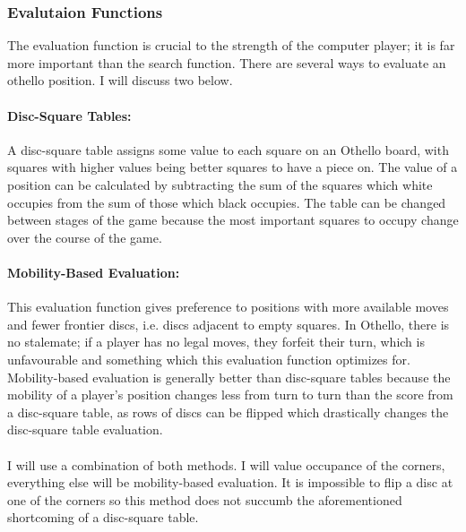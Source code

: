 \documentclass[12pt, a4paper]{report}
\begin{document}
\subsubsection{Evalutaion Functions}

The evaluation function is crucial to the strength of the computer player; it is far more important than the search function.
There are several ways to evaluate an othello position. I will discuss two below.

\paragraph{Disc-Square Tables:}

A disc-square table assigns some value to each square on an Othello board, with squares with higher values being better squares
to have a piece on. The value of a position can be calculated by subtracting the sum of
the squares which white occupies from the sum of those which black occupies. The table can be changed between stages of the game
because the most important squares to occupy change over the course of the game.

\paragraph{Mobility-Based Evaluation:}

This evaluation function gives preference to positions with more available moves and fewer frontier discs, i.e. discs adjacent to
empty squares. In Othello, there is no stalemate; if a player has no legal moves, they forfeit their turn, which is unfavourable
and something which this evaluation function optimizes for. Mobility-based evaluation is generally better than disc-square tables because
the mobility of a player's position changes less from turn to turn than the score from a disc-square table, as rows of discs can be
flipped which drastically changes the disc-square table evaluation.
\\ \\
I will use a combination of both methods.
I will value occupance of the corners, everything else will be mobility-based evaluation.
It is impossible to flip a disc at one of the corners so this method does not succumb the aforementioned shortcoming of a disc-square table. 
\end{document}
